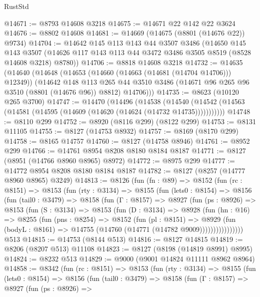 \begin{lexlean}{RustStd}
\begin{coremodule}
@14671 := @8793 @14608 @3218
@14675 := @14671 @22 @142 @22 @3624
@14676 := @8802 @14608
@14681 := @14669 (@14675 (@8801 (@14676 @22)) @9734)
@14704 := @14642
    @145
    @113
    @143
    @44
    @3507
    @3486
    (@14650
      @145
      @143
      @3507
      (@14626 @117 @143 @113 @44 @3472 @3486 @3505 @8519 (@8528 @14608 @3218) @8780))
@14706 := @8818 @14608 @3218
@14732 := @14635
    (@14640
      (@14648
        (@14653 (@14660 (@14663 (@14681 (@14704 @14706))) @12349))
        (@14642
          @148
          @113
          @265
          @44
          @3510
          @3486
          (@14671 @96 @265 @96 @3510 (@8801 (@14676 @96)) @8812)
          @14706)))
@14735 := @8623 (@10120 @265 @3700)
@14747 := @14470
    (@14496
      (@14538
        (@14540 (@14542 (@14563 (@14581 (@14595 (@14609 (@14620 (@14624 (@14732 @14735)))))))))))
@14748 := @8110 @299
@14752 := @8920 (@8116 @299) (@8122 @299)
@14753 := @8131 @11105
@14755 := @8127 (@14753 @8932)
@14757 := @8169 (@8170 @299)
@14758 := @8165 @14757
@14760 := @8127 (@14758 @8946)
@14761 := @8952 @299
@14766 := @14761 @8954 @8208 @8180 @8184 @8187
@14771 := @8127 (@8951 (@14766 @8960 @8965) @8972)
@14772 := @8975 @299
@14777 := @14772 @8954 @8208 @8180 @8184 @8187
@14782 := @8127 (@8257 (@14777 @8960 @8965) @3249)
@14813 := @8126
    (fun (fn : @89) =>
    @8152
      (fun (rc : @8151) =>
      @8153
        (fun (rty : @3134) =>
        @8155
          (fun (lets0 : @8154) =>
          @8156
            (fun (tail0 : @3479) =>
            @8158
              (fun (Γ : @8157) =>
              @8927
                (fun (ps : @8926) =>
                @8153
                  (fun (S : @3134) =>
                  @8153
                    (fun (D : @3134) =>
                    @8928
                      (fun (hn : @16) =>
                      @8255
                        (fun (pns : @8254) =>
                        @8152
                          (fun (pl : @8151) =>
                          @8929
                            (fun (bodyL : @8161) =>
                            @14755 (@14760 (@14771 (@14782 @9009))))))))))))))))
    @513
@14815 := @14753 (@8144 @513)
@14816 := @8127 @14815
@14819 := @8206 (@8207 @513) @11108
@14823 := @8127 (@8198 (@14819 @8991) @8995)
@14824 := @8232 @513
@14829 := @9000 (@9001 @14824 @11111 @8962 @8964)
@14858 := @8342
    (fun (rc : @8151) =>
    @8153
      (fun (rty : @3134) =>
      @8155
        (fun (lets0 : @8154) =>
        @8156
          (fun (tail0 : @3479) =>
          @8158
            (fun (Γ : @8157) =>
            @8927
              (fun (ps : @8926) =>

\end{coremodule}
\end{lexlean}
